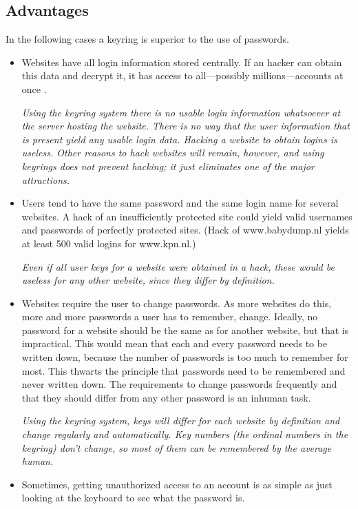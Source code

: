 \subsection{Advantages}
In the following cases a keyring is superior to the use of passwords.
\begin{itemize}
\item Websites have all login information stored centrally.
If an hacker can obtain this data and decrypt it, it has access to all---possibly millions---accounts at once \cite{wiki:linkedin}.
\par
\emph{Using the keyring system there is no usable login information whatsoever at the server hosting the website.
There is no way that the user information that \emph{is} present yield any usable login data.
Hacking a website to obtain logins is useless.
\linebreak
Other reasons to hack websites will remain, however, and using keyrings does not prevent hacking; it just eliminates one of the major attractions.}
\item Users tend to have the same password and the same login name for several websites.
A hack of an insufficiently protected site could yield valid usernames and passwords of perfectly protected sites.
(Hack of www.babydump.nl yields at least 500 valid logins for www.kpn.nl.)
\par
\emph{Even if all user keys for a website were obtained in a hack, these would be useless for any other website, since they differ by definition.}
\item Websites require the user to change passwords.
As more websites do this, more and more passwords a user has to remember, change.
Ideally, no password for a website should be the same as for another website, but that is impractical.
This would mean that each and every password needs to be written down, because the number of passwords is too much to remember for most.
This thwarts the principle that passwords need to be remembered and never written down.
The requirements to change passwords frequently and that they should differ from any other password is an inhuman task.
\par
\emph{Using the keyring system, keys will differ for each website by definition and change regularly and automatically.
Key numbers (the ordinal numbers in the keyring) don't change, so most of them can be remembered by the average human.}
\item Sometimes, getting unauthorized access to an account is as simple as just looking at the keyboard to see what the password is.

\end{itemize}
